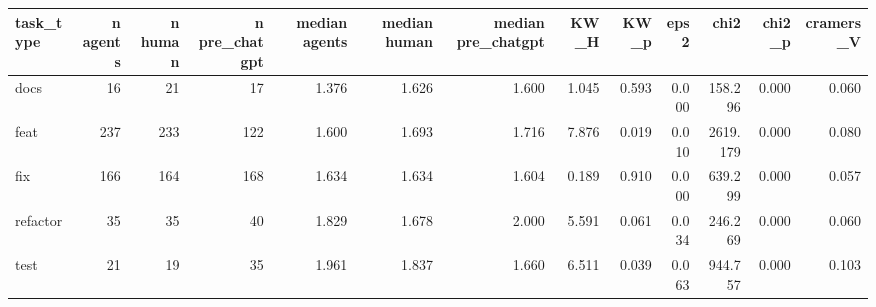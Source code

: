 \begin{tabular}{lrrrrrrrrrrrr}
\toprule
task_type & n agents & n human & n pre_chatgpt & median agents & median human & median pre_chatgpt & KW_H & KW_p & eps2 & chi2 & chi2_p & cramers_V \\
\midrule
docs & 16 & 21 & 17 & 1.376 & 1.626 & 1.600 & 1.045 & 0.593 & 0.000 & 158.296 & 0.000 & 0.060 \\
feat & 237 & 233 & 122 & 1.600 & 1.693 & 1.716 & 7.876 & 0.019 & 0.010 & 2619.179 & 0.000 & 0.080 \\
fix & 166 & 164 & 168 & 1.634 & 1.634 & 1.604 & 0.189 & 0.910 & 0.000 & 639.299 & 0.000 & 0.057 \\
refactor & 35 & 35 & 40 & 1.829 & 1.678 & 2.000 & 5.591 & 0.061 & 0.034 & 246.269 & 0.000 & 0.060 \\
test & 21 & 19 & 35 & 1.961 & 1.837 & 1.660 & 6.511 & 0.039 & 0.063 & 944.757 & 0.000 & 0.103 \\
\bottomrule
\end{tabular}
